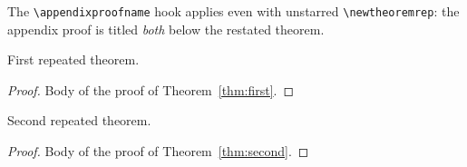\documentclass{article}
\begin{document}
The \texttt{\textbackslash appendixproofname} hook applies even with
unstarred \texttt{\textbackslash newtheoremrep}: the appendix proof is
titled \emph{both} below the restated theorem.

\begin{theoremrep}\label{thm:first}
  First repeated theorem.
\end{theoremrep}
\begin{proof}
  Body of the proof of Theorem~\ref{thm:first}.
\end{proof}

\begin{theoremrep}\label{thm:second}
  Second repeated theorem.
\end{theoremrep}
\begin{proof}
  Body of the proof of Theorem~\ref{thm:second}.
\end{proof}
\end{document}
